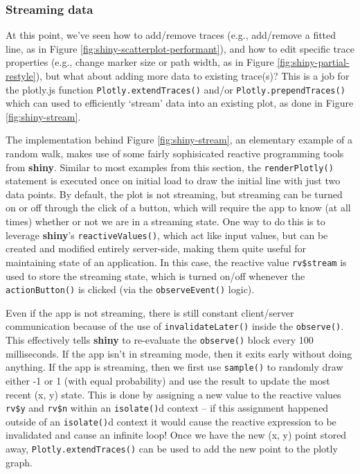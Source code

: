 \documentclass[
  12pt,
]{krantz}
\begin{document}
\hypertarget{streaming}{%
\subsubsection{Streaming data}\label{streaming}}

At this point, we've seen how to add/remove traces (e.g., add/remove a fitted line, as in Figure \ref{fig:shiny-scatterplot-performant}), and how to edit specific trace properties (e.g., change marker size or path width, as in Figure \ref{fig:shiny-partial-restyle}), but what about adding more data to existing trace(s)? This is a job for the plotly.js function \texttt{Plotly.extendTraces()} and/or \texttt{Plotly.prependTraces()} which can used to efficiently `stream' data into an existing plot, as done in Figure \ref{fig:shiny-stream}.

The implementation behind Figure \ref{fig:shiny-stream}, an elementary example of a random walk, makes use of some fairly sophisicated reactive programming tools from \textbf{shiny}. Similar to most examples from this section, the \texttt{renderPlotly()} statement is executed once on initial load to draw the initial line with just two data points. By default, the plot is not streaming, but streaming can be turned on or off through the click of a button, which will require the app to know (at all times) whether or not we are in a streaming state. One way to do this is to leverage \textbf{shiny}'s \texttt{reactiveValues()}, which act like input values, but can be created and modified entirely server-side, making them quite useful for maintaining state of an application. In this case, the reactive value \texttt{rv\$stream} is used to store the streaming state, which is turned on/off whenever the \texttt{actionButton()} is clicked (via the \texttt{observeEvent()} logic).

Even if the app is not streaming, there is still constant client/server communication because of the use of \texttt{invalidateLater()} inside the \texttt{observe()}. This effectively tells \textbf{shiny} to re-evaluate the \texttt{observe()} block every 100 milliseconds. If the app isn't in streaming mode, then it exits early without doing anything. If the app is streaming, then we first use \texttt{sample()} to randomly draw either -1 or 1 (with equal probability) and use the result to update the most recent (x, y) state. This is done by assigning a new value to the reactive values \texttt{rv\$y} and \texttt{rv\$n} within an \texttt{isolate()}d context -- if this assignment happened outside of an \texttt{isolate()}d context it would cause the reactive expression to be invalidated and cause an infinite loop! Once we have the new (x, y) point stored away, \texttt{Plotly.extendTraces()} can be used to add the new point to the plotly graph.
\end{document}
